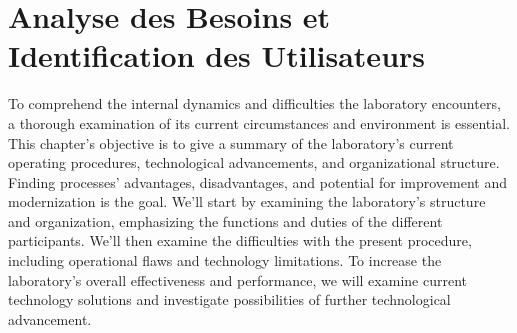 \chapter{Analyse des Besoins et Identification des Utilisateurs}

To comprehend the internal dynamics and difficulties the laboratory encounters, a thorough examination of its current circumstances and environment is essential. This chapter's objective is to give a summary of the laboratory's current operating procedures, technological advancements, and organizational structure. Finding processes' advantages, disadvantages, and potential for improvement and modernization is the goal.
We'll start by examining the laboratory's structure and organization, emphasizing the functions and duties of the different participants. We'll then examine the difficulties with the present procedure, including operational flaws and technology limitations. To increase the laboratory's overall effectiveness and performance, we will examine current technology solutions and investigate possibilities of further technological advancement.

\clearpage


